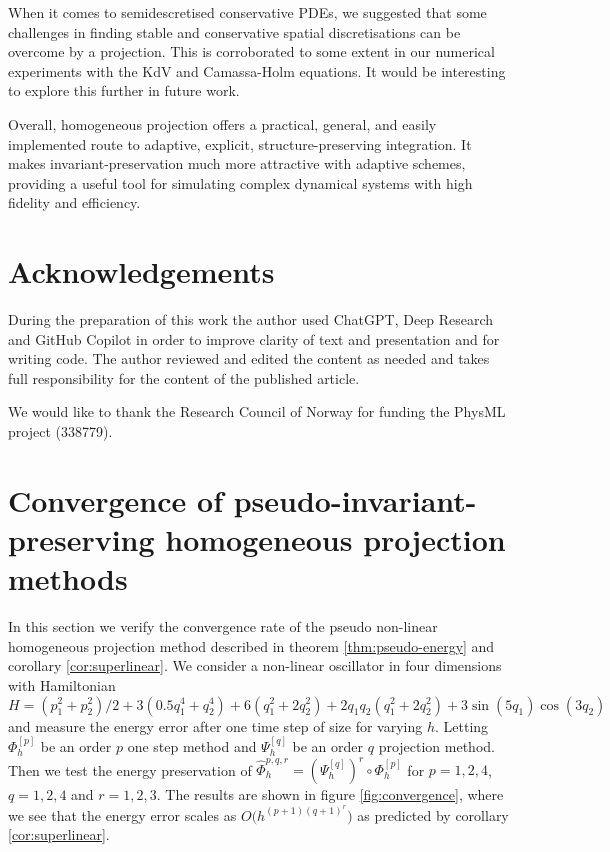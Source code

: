 \documentclass[final,3p,times]{elsarticle}
\begin{document}
When it comes to semidescretised conservative PDEs, we suggested that some challenges in finding stable and conservative spatial discretisations can be overcome by a projection. This is corroborated to some extent in our numerical experiments with the KdV and Camassa-Holm equations. It would be interesting to explore this further in future work.

Overall, homogeneous projection offers a practical, general, and easily implemented route to adaptive, explicit, structure-preserving integration. It makes invariant-preservation much more attractive with adaptive schemes, providing a useful tool for simulating complex dynamical systems with high fidelity and efficiency.

\section*{Acknowledgements}
During the preparation of this work the author used ChatGPT, Deep Research and GitHub Copilot in order to improve clarity of text and presentation and for writing code. The author reviewed and edited the content as needed and takes full responsibility for the content of the published article.

We would like to thank the Research Council of Norway for funding the PhysML project (338779).



\appendix
\section{Convergence of pseudo-invariant-preserving homogeneous projection methods}\label{app:energy convergence}
In this section we verify the convergence rate of the pseudo non-linear homogeneous projection method described in theorem \ref{thm:pseudo-energy} and corollary \ref{cor:superlinear}. We consider a non-linear oscillator in four dimensions with Hamiltonian
\begin{equation}\label{eq:nonlinear oscillator}
  H = (p_1^2 + p_2^2)/2 + 3(0.5q_1^4 + q_2^4) + 6(q_1^2 + 2q_2^2) + 2q_1q_2(q_1^2 + 2q_2^2) + 3\sin(5q_1)\cos(3q_2)
\end{equation}
and measure the energy error after one time step of size for varying $h$. Letting $\Phi_h^{[p]}$ be an order $p$ one step method and $\Psi_h^{[q]}$ be an order $q$ projection method. Then we test the energy preservation of $\widehat{\Phi}_h^{p,q,r}= \left(\Psi_h^{[q]}\right)^{r}\circ\Phi_h^{[p]}$ for $p = 1, 2, 4$, $q=1, 2, 4$ and $r=1, 2, 3$. The results are shown in figure \ref{fig:convergence}, where we see that the energy error scales as $O\big(h^{(p+1)(q+1)^r}\big)$ as predicted by corollary \ref{cor:superlinear}.
\end{document}
